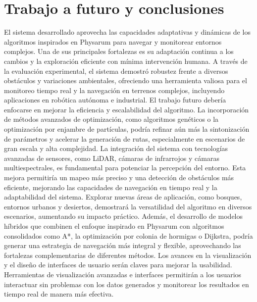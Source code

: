 \section{Trabajo a futuro y conclusiones}
    El sistema desarrollado aprovecha las capacidades adaptativas y din\'amicas de los algoritmos inspirados 
        en Physarum para navegar y monitorear entornos complejos. Una de sus principales fortalezas es su 
        adaptaci\'on continua a los cambios y la exploraci\'on eficiente con m\'inima intervenci\'on humana. 
        A trav\'es de la evaluaci\'on experimental, el sistema demostr\'o robustez frente a diversos 
        obst\'aculos y variaciones ambientales, ofreciendo una herramienta valiosa para el monitoreo 
        tiempo real y la navegaci\'on en terrenos complejos, incluyendo aplicaciones en rob\'otica aut\'onoma e industrial.
    \vskip 0.5cm
    El trabajo futuro deber\'ia enfocarse en mejorar la eficiencia y escalabilidad del algoritmo. La 
        incorporaci\'on de m\'etodos avanzados de optimizaci\'on, como algoritmos gen\'eticos o la optimizaci\'on 
        por enjambre de part\'iculas, podr\'ia refinar a\'un m\'as la sintonizaci\'on de par\'ametros y acelerar 
        la generaci\'on de rutas, especialmente en escenarios de gran escala y alta complejidad.
    \vskip 0.5cm
    La integraci\'on del sistema con tecnolog\'ias avanzadas de sensores, como LiDAR, c\'amaras de 
        infrarrojos y c\'amaras multiespectrales, es fundamental para potenciar la percepci\'on del 
        entorno. Esta mejora permitir\'ia un mapeo m\'as preciso y una detecci\'on de obst\'aculos m\'as eficiente, 
        mejorando las capacidades de navegaci\'on en tiempo real y la adaptabilidad del sistema.
    \vskip 0.5cm
    Explorar nuevas \'areas de aplicaci\'on, como bosques, entornos urbanos y desiertos, demostrar\'a la versatilidad 
        del algoritmo en diversos escenarios, aumentando su impacto pr\'actico. Adem\'as, el desarrollo de modelos 
        h\'ibridos que combinen el enfoque inspirado en Physarum con algoritmos consolidados como A*, la optimizaci\'on 
        por colonia de hormigas o Dijkstra, podr\'ia generar una estrategia de navegaci\'on m\'as integral y flexible, 
        aprovechando las fortalezas complementarias de diferentes m\'etodos.
    \vskip 0.5cm
    Los avances en la visualizaci\'on y el dise\~no de interfaces de usuario ser\'an claves para mejorar la usabilidad. 
        Herramientas de visualizaci\'on avanzadas e interfaces permitir\'an a los usuarios interactuar sin problemas 
        con los datos generados y monitorear los resultados en tiempo real de manera m\'as efectiva.
